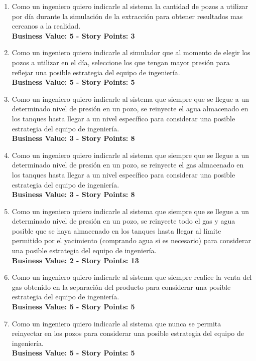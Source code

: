 \begin{enumerate}
  \item Como un ingeniero quiero indicarle al sistema la cantidad de pozos a utilizar por día durante la simulación de la extracción para obtener resultados mas cercanos a la realidad.\\
  \textbf{Business Value: 5 - Story Points: 3}
  
  \item Como un ingeniero quiero indicarle al simulador que al momento de elegir los pozos a utilizar en el día, seleccione los que tengan mayor presión para reflejar una posible estrategia del equipo de ingeniería.\\
  \textbf{Business Value: 5 - Story Points: 5}
  
  \item Como un ingeniero quiero indicarle al sistema que siempre que se llegue a un determinado nivel de presión en un pozo, se reinyecte el agua almacenado en los tanques hasta llegar a un nivel específico para considerar una posible estrategia del equipo de ingeniería.\\
  \textbf{Business Value: 3 - Story Points: 8}
  
  \item Como un ingeniero quiero indicarle al sistema que siempre que se llegue a un determinado nivel de presión en un pozo, se reinyecte el gas almacenado en los tanques hasta llegar a un nivel específico para considerar una posible estrategia del equipo de ingeniería.\\
  \textbf{Business Value: 3 - Story Points: 8}
  
  \item Como un ingeniero quiero indicarle al sistema que siempre que se llegue a un determinado nivel de presión en un pozo, se reinyecte todo el gas y agua posible que se haya almacenado en los tanques hasta llegar al límite permitido por el yacimiento (comprando agua si es necesario) para considerar una posible estrategia del equipo de ingeniería.\\
  \textbf{Business Value: 2 - Story Points: 13}
  
  \item Como un ingeniero quiero indicarle al sistema que siempre realice la venta del gas obtenido en la separación del producto para considerar una posible estrategia del equipo de ingeniería.\\
  \textbf{Business Value: 5 - Story Points: 5}
  
  \item Como un ingeniero quiero indicarle al sistema que nunca se permita reinyectar en los pozos para considerar una posible estrategia del equipo de ingeniería.\\
  \textbf{Business Value: 5 - Story Points: 5}
  

\end{enumerate}
